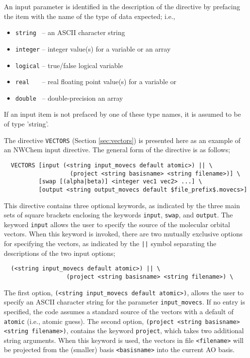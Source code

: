 An input parameter is identified in the description of the directive
by prefacing the item with the name of the type of data expected;
i.e.,

\begin{itemize}
\item \verb+string +  -- an ASCII character string
\item \verb+integer+ --  integer value(s) for a variable or an array
\item \verb+logical+ --  true/false logical variable
\item \verb+real   +  -- real floating point value(s) for a variable or 
\item \verb+double + -- double-precision
an array
\end{itemize}

If an input item is not prefaced by one of these type names,
it is assumed to be of type 'string'.
 
The directive \verb+VECTORS+ (Section \ref{sec:vectors}) is presented here
as an example of an NWChem input directive.  The general form of the
directive is as follows;
\begin{verbatim}
  VECTORS [input (<string input_movecs default atomic>) || \
                   (project <string basisname> <string filename>)] \
          [swap [(alpha|beta)] <integer vec1 vec2> ...] \
          [output <string output_movecs default $file_prefix$.movecs>]
\end{verbatim}

This directive contains three optional keywords, as indicated by the 
three main sets of square brackets enclosing the keywords \verb+input+,
\verb+swap+, and \verb+output+.  The keyword \verb+input+ allows the
user to specify the source of the molecular orbital vectors.  When
this keyword is invoked, there are two mutually exclusive options for
specifying the vectors, as indicated by the \verb+||+ symbol
separating the descriptions of the two input options;

\begin{verbatim}
  (<string input_movecs default atomic>) || \
                  (project <string basisname> <string filename>) \
\end{verbatim}

The first option, \verb+(<string input_movecs default atomic>)+,
allows the user to specify an ASCII character string for the parameter
{\tt input\_movecs}.  If no entry is specified, the code assumes a
standard source of the vectors with a default of \verb+atomic+ (i.e.,
atomic guess).  The second option, {\tt(project <string basisname>
  <string filename>)}, contains the keyword \verb+project+, which
takes two additional string arguments.  When this keyword is used, the
vectors in file \verb+<filename>+ will be projected from the (smaller)
basis \verb+<basisname>+ into the current AO basis.

